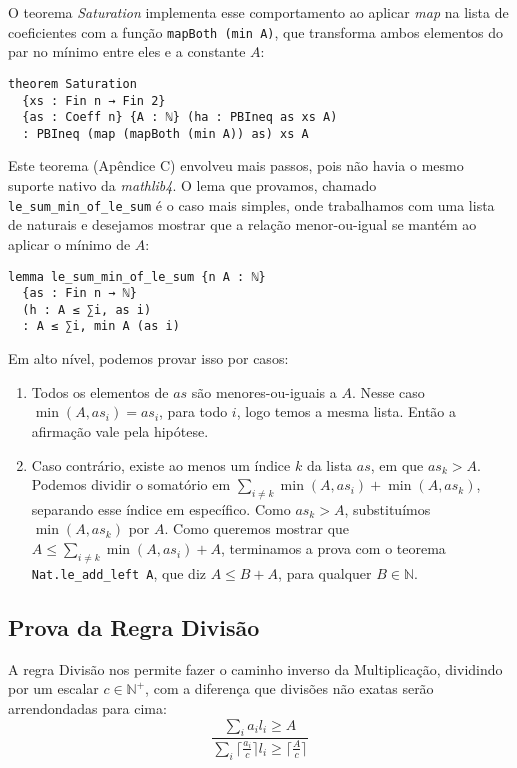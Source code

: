 \documentclass[conference]{IEEEtran}
\begin{document}
O teorema \textit{Saturation} implementa esse comportamento ao aplicar \textit{map} na lista de coeficientes com a função
\texttt{mapBoth (min A)}, que transforma ambos elementos do par no mínimo entre eles e a constante $A$:
\begin{verbatim}
theorem Saturation
  {xs : Fin n → Fin 2}
  {as : Coeff n} {A : ℕ} (ha : PBIneq as xs A)
  : PBIneq (map (mapBoth (min A)) as) xs A
\end{verbatim}

Este teorema (Apêndice C) envolveu mais passos, pois não havia o mesmo suporte nativo da \textit{mathlib4}.
O lema que provamos, chamado \texttt{le\_sum\_min\_of\_le\_sum} é o caso mais simples, onde trabalhamos com uma
lista de naturais e desejamos mostrar que a relação menor-ou-igual se mantém ao aplicar o mínimo de $A$:
\begin{verbatim}
lemma le_sum_min_of_le_sum {n A : ℕ}
  {as : Fin n → ℕ}
  (h : A ≤ ∑i, as i)
  : A ≤ ∑i, min A (as i)
\end{verbatim}

Em alto nível, podemos provar isso por casos:
\begin{enumerate}
    \item Todos os elementos de $as$ são menores-ou-iguais a $A$.
          Nesse caso $\min(A,as_i) = as_i$, para todo $i$, logo temos a mesma lista.
          Então a afirmação vale pela hipótese.
    \item Caso contrário, existe ao menos um índice $k$ da lista $as$, em que $as_k > A$.
          Podemos dividir o somatório em $\sum_{i\neq k}{\min(A,as_i) + \min(A,as_k)}$, separando esse índice em específico.
          Como $as_k > A$, substituímos $\min(A,as_k)$ por $A$.
          Como queremos mostrar que $A \le \sum_{i\neq k}{\min(A,as_i) + A}$,
          terminamos a prova com o teorema \texttt{Nat.le\_add\_left A}, que diz
          $A \le B + A$, para qualquer $B \in \mathbb{N}$.

\end{enumerate}


\subsection{Prova da Regra Divisão}
A regra Divisão nos permite fazer o caminho inverso da Multiplicação, dividindo por um escalar $c \in \mathbb{N}^+$, com a diferença que divisões não exatas serão arrendondadas
para cima:
\begin{equation}
    \frac
    {\sum_i{a_i l_i} \ge A}
    {\sum_i{ \lceil \frac{a_i}{c} \rceil l_i} \ge \lceil \frac{A}{c} \rceil}
\end{equation}
\end{document}
